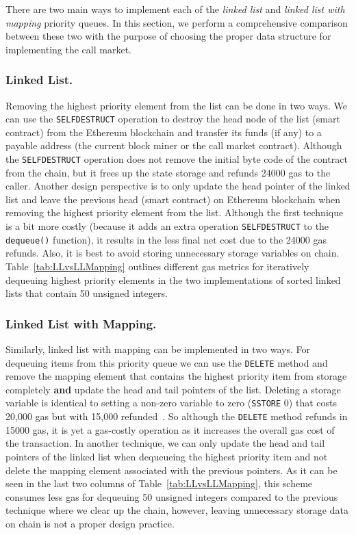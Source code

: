 There are two main ways to implement each of the \textit{linked list} and \textit{linked list with mapping} priority queues. In this section, we perform a comprehensive comparison between these two with the purpose of choosing the proper data structure for implementing the call market.


\subsubsection*{Linked List.} Removing the highest priority element from the list can be done in two ways. We can use the \texttt{SELFDESTRUCT} operation to destroy the head node of the list (\ie smart contract) from the Ethereum blockchain and transfer its funds (if any) to a payable address (\eg the current block miner or the call market contract). Although the \texttt{SELFDESTRUCT} operation does not remove the initial byte code of the contract from the chain, but it frees up the state storage and refunds 24000 gas to the caller. Another design perspective is to only update the head pointer of the linked list and leave the previous head (\ie smart contract) on Ethereum blockchain when removing the highest priority element from the list. Although the first technique is a bit more costly (because it adds an extra operation \texttt{SELFDESTRUCT} to the \texttt{dequeue()} function), it results in the less final net cost due to the 24000 gas refunds. Also, it is best to avoid storing unnecessary storage variables on chain. Table~\ref{tab:LLvsLLMapping} outlines different gas metrics for iteratively dequeuing highest priority elements in the two implementations of sorted linked lists that contain 50 unsigned integers.


\subsubsection*{Linked List with Mapping.} Similarly, linked list with mapping can be implemented in two ways. For dequeuing items from this priority queue we can use the \texttt{DELETE} method and remove the mapping element that contains the highest priority item from storage completely  \textbf{and} update the head and tail pointers of the list. Deleting a storage variable is identical to setting a non-zero variable to zero (\texttt{SSTORE} 0) that costs 20,000 gas but with 15,000 refunded~\cite{wood2014ethereum}. So although the \texttt{DELETE} method refunds in 15000 gas, it is yet a gas-costly operation  as it increases the overall gas cost of the transaction. In another technique, we can only update the head and tail pointers of the linked list when dequeueing the highest priority item and not delete the mapping element associated with the previous pointers. As it can be seen in the last two columns of Table~\ref{tab:LLvsLLMapping}, this scheme consumes less gas for dequeuing 50 unsigned integers compared to the previous technique where we clear up the chain, however, leaving unnecessary storage data on chain is not a proper design practice.




